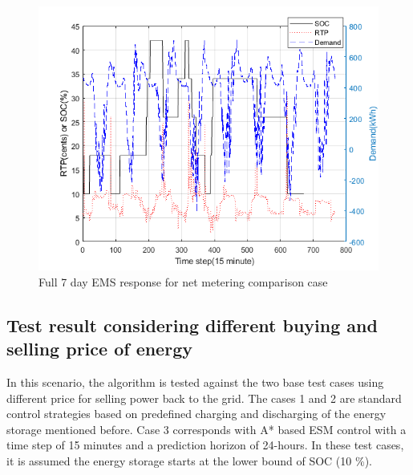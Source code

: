 \begin{figure}[!ht]
    \centering
    \includegraphics[width = \linewidth]{figs/SBMPO_COMP_10_12.png}
    \caption{Full 7 day EMS response for net metering comparison case}
    \label{fig:SBMPO_COMP_10_12}
\end{figure}


\subsection{Test result considering different buying and selling price of energy}
In this scenario, the algorithm is tested against the two base test cases using different price for selling power back to the grid. The cases 1 and 2 are standard control strategies based on predefined charging and discharging of the energy storage mentioned before. Case 3 corresponds with A* based ESM control with a time step of 15 minutes and a prediction horizon of 24-hours. In these test cases, it is assumed the energy storage starts at the lower bound of SOC (10 \%).

